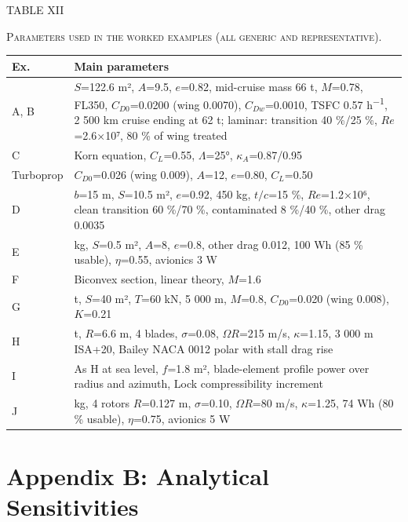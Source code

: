 \documentclass[10pt,a4paper,twocolumn]{article}
\begin{document}
\begin{table}[!t]
\centering
{\footnotesize TABLE XII\par\textsc{Parameters used in the worked examples (all generic and
representative).}\par}\vspace{4pt}
{\footnotesize\setlength{\tabcolsep}{4pt}\renewcommand{\arraystretch}{1.12}
\begin{tabularx}{\textwidth}{l>{\raggedright\arraybackslash}X}
\toprule
\textbf{Ex.} & \textbf{Main parameters} \\
\midrule
A, B & \(S\)=122.6 m², \(A\)=9.5, \(e\)=0.82, mid-cruise mass 66 t, \(M\)=0.78,
FL350, \(C_{D0}\)=0.0200 (wing 0.0070), \(C_{Dw}\)=0.0010, TSFC 0.57
h\textsuperscript{−1}, 2 500 km cruise ending at 62 t; laminar:
transition 40 \%/25 \%, \(Re\)=2.6×10⁷, 80 \% of wing treated \\
C & Korn equation, \(C_L\)=0.55, \(\Lambda\)=25°, \(\kappa_A\)=0.87/0.95 \\
Turboprop & \(C_{D0}\)=0.026 (wing 0.009), \(A\)=12, \(e\)=0.80, \(C_L\)=0.50 \\
D & \(b\)=15 m, \(S\)=10.5 m², \(e\)=0.92, 450 kg, \(t/c\)=15 \%,
\(Re\)=1.2×10⁶, clean transition 60 \%/70 \%, contaminated 8 \%/40 \%,
other drag 0.0035 \\
E & 2.5 kg, \(S\)=0.5 m², \(A\)=8, \(e\)=0.8, other drag 0.012, 100 Wh (85
\% usable), \(\eta\)=0.55, avionics 3 W \\
F & Biconvex section, linear theory, \(M\)=1.6 \\
G & 10 t, \(S\)=40 m², \(T\)=60 kN, 5 000 m, \(M\)=0.8, \(C_{D0}\)=0.020
(wing 0.008), \(K\)=0.21 \\
H & 5.5 t, \(R\)=6.6 m, 4 blades, \(\sigma\)=0.08, \(\Omega R\)=215 m/s,
\(\kappa\)=1.15, 3 000 m ISA+20, Bailey NACA 0012 polar with stall drag
rise \\
I & As H at sea level, \(f\)=1.8 m², blade-element profile power over radius
and azimuth, Lock compressibility increment \\
J & 2 kg, 4 rotors \(R\)=0.127 m, \(\sigma\)=0.10, \(\Omega R\)=80 m/s,
\(\kappa\)=1.25, 74 Wh (80 \% usable), \(\eta\)=0.75, avionics 5 W \\
\bottomrule
\end{tabularx}
}
\end{table}

\hypertarget{appendix-b-analytical-sensitivities}{%
\section*{Appendix B: Analytical
Sensitivities}\label{appendix-b-analytical-sensitivities}}
\end{document}
